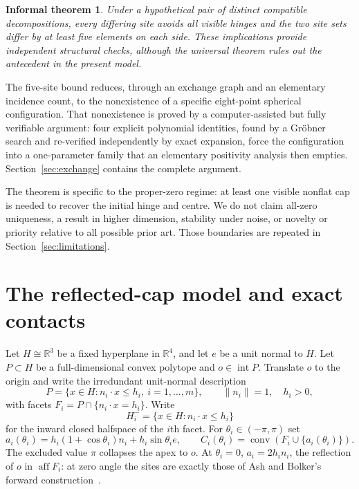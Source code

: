 \documentclass[11pt]{amsart}
\newtheorem*{informaltheorem}{Informal theorem}
\theoremstyle{definition}
\newcommand{\R}{\mathbb{R}}
\newcommand{\conv}{\operatorname{conv}}
\newcommand{\aff}{\operatorname{aff}}
\begin{document}
\begin{informaltheorem}
Under a hypothetical pair of distinct compatible decompositions, every
differing site avoids all visible hinges and the two site sets differ by at
least five elements on each side.  These implications provide independent
structural checks, although the universal theorem rules out the antecedent in
the present model.
\end{informaltheorem}

The five-site bound reduces, through an exchange graph and an elementary
incidence count, to the nonexistence of a specific eight-point spherical
configuration.
That nonexistence is proved by a computer-assisted but fully verifiable
argument: four explicit polynomial identities, found by a Gr\"obner search and
re-verified independently by exact expansion, force the configuration into a
one-parameter family that an elementary positivity analysis then empties.
Section~\ref{sec:exchange} contains the complete argument.

The theorem is specific to the proper-zero regime: at least one visible
nonflat cap is needed to recover the initial hinge and centre.  We do not claim
all-zero uniqueness, a result in higher dimension, stability under noise, or
novelty or priority relative to all possible prior art.  Those boundaries are
repeated in Section~\ref{sec:limitations}.

\section{The reflected-cap model and exact contacts}
\label{sec:model}

Let $H\cong\R^3$ be a fixed hyperplane in $\R^4$, and let $e$ be a unit normal
to $H$.  Let $P\subset H$ be a full-dimensional convex polytope and
$o\in\operatorname{int}P$.  Translate $o$ to the origin and write the
irredundant unit-normal description
\[
P=\{x\in H:n_i\cdot x\le h_i,\ i=1,\ldots,m\},
 \qquad \|n_i\|=1,\quad h_i>0,
\]
with facets $F_i=P\cap\{n_i\cdot x=h_i\}$.
Write
\[
 H_i^-=\{x\in H:n_i\cdot x\le h_i\}
\]
for the inward closed halfspace of the $i$th facet.
For $\theta_i\in(-\pi,\pi)$ set
\[
 a_i(\theta_i)=h_i(1+\cos\theta_i)n_i+h_i\sin\theta_i e,
 \qquad
 C_i(\theta_i)=\conv(F_i\cup\{a_i(\theta_i)\}).
\]
The excluded value $\pi$ collapses the apex to $o$.  At $\theta_i=0$,
$a_i=2h_i n_i$, the reflection of $o$ in $\aff F_i$: at zero angle the sites
are exactly those of Ash and Bolker's forward
construction~\cite{AshBolker1985}.
\end{document}
